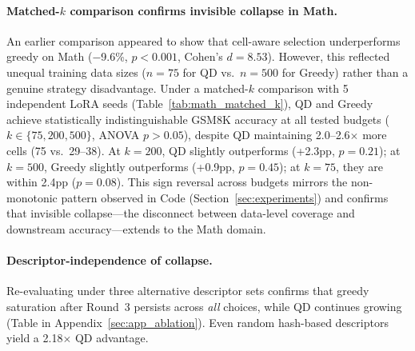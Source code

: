 \documentclass{article}
\begin{document}
\begin{enumerate}[nosep]
\paragraph{Matched-$k$ comparison confirms invisible collapse in Math.}
An earlier comparison appeared to show that cell-aware selection underperforms greedy on Math ($-$9.6\%, $p{<}0.001$, Cohen's $d{=}8.53$).
However, this reflected unequal training data sizes ($n{=}75$ for QD vs.\ $n{=}500$ for Greedy) rather than a genuine strategy disadvantage.
Under a matched-$k$ comparison with 5 independent LoRA seeds (Table~\ref{tab:math_matched_k}), QD and Greedy achieve statistically indistinguishable GSM8K accuracy at all tested budgets ($k{\in}\{75, 200, 500\}$, ANOVA $p{>}0.05$), despite QD maintaining 2.0--2.6$\times$ more cells (75 vs.\ 29--38).
At $k{=}200$, QD slightly outperforms (+2.3pp, $p{=}0.21$); at $k{=}500$, Greedy slightly outperforms (+0.9pp, $p{=}0.45$); at $k{=}75$, they are within 2.4pp ($p{=}0.08$).
This sign reversal across budgets mirrors the non-monotonic pattern observed in Code (Section~\ref{sec:experiments}) and confirms that invisible collapse---the disconnect between data-level coverage and downstream accuracy---extends to the Math domain.

\paragraph{Descriptor-independence of collapse.}
Re-evaluating under three alternative descriptor sets confirms that greedy saturation after Round~3 persists across \emph{all} choices, while QD continues growing (Table in Appendix~\ref{sec:app_ablation}).
Even random hash-based descriptors yield a 2.18$\times$ QD advantage.


\end{enumerate}
\end{document}
